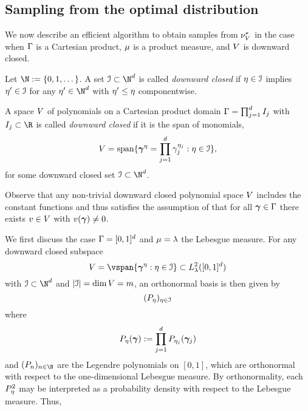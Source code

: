 \subsection{Sampling from the optimal distribution}\label{sec:optimal-sampling}
We now describe an efficient algorithm to obtain samples from $\nu^{*}_{V}$ in the case when $\Gamma$ is a Cartesian product,  $\mu$ is a product measure, and $V$ is downward closed.
\begin{definition}
	Let $\N:=\{0,1,\dots\}$.
	A set $\mis\subset\N^d$ is called \emph{downward closed} if $\eta \in\mathcal{I}$ implies $\eta'\in\mathcal{I}$ for any $\mipp\in\N^{\dps}$ with $\eta'\leq \eta$ componentwise.

	A space $V$ of polynomials on a Cartesian product domain $\Gamma=\prod_{j=1}^{d}I_j$
	with $I_j\subset\R$ is called \emph{downward closed} if
	it is the span of monomials,
	 $$
	V=\operatorname{span}\{\bm{\gamma}^{\eta}=\prod_{j=1}^{d}\gamma_{j}^{\eta_j}:\eta\in\mathcal{I}\},
	$$
	for some downward closed set $\mis\subset \N^d$.
\end{definition}
\begin{rem}
	Observe that any non-trivial downward closed polynomial space $V$ includes the constant functions and thus satisfies the assumption of  that for all $\bm{\gamma}\in\Gamma$ there exists $v\in V$ with $v(\bm{\gamma})\not =0$.
\end{rem}
We first discuss the case $\Gamma=[0,1]^d$ and $\mu=\lambda$ the Lebesgue measure. For any downward closed subspace
\begin{equation*}
\vsp=\vspan\{\psmi^{\mip}:\mip\in\mis\}\subset L^2_{\lambda}([0,1]^d)
\end{equation*} with $\mis\subset\N^{d}$ and $|\mathcal{I}|=\dim V=m$, 
an orthonormal basis is then given by
\begin{equation*}
(P_{\eta})_{\eta\in\mathcal{I}}
\end{equation*}
where
\begin{equation*}
P_{\eta}(\bm{\gamma}):=\prod_{j=1}^{d}P_{\eta_j}(\bm{\gamma}_j)
\end{equation*}
and $(\leg_n)_{n\in \N}$ are the Legendre polynomials on $[0,1]$, which are orthonormal with respect to the one-dimensional Lebesgue measure. By orthonormality, each $P_{\eta}^2$ may be interpreted as a probability density with respect to the Lebesgue measure. Thus,
